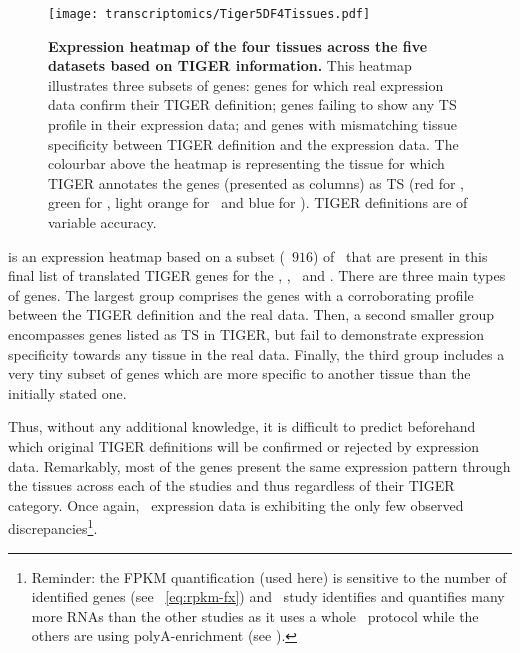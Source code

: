 \begin{figure}[!ht]
    \texttt{[image: transcriptomics/Tiger5DF4Tissues.pdf]}\centering
    \vspace{-.15in}
    \caption[Expression heatmap of the four tissues across the five datasets based on
    TiGER]{\label{fig:TigerGenes}\textbf{Expression heatmap of the four tissues
    across the five datasets based on \gls{TIGER} information.}
    This heatmap illustrates three subsets of genes:
    genes for which real expression data confirm their \gls{TIGER} definition;
    genes failing to show any \gls{TS} profile in their expression data; and
    genes with mismatching tissue specificity between \gls{TIGER}
    definition and the expression data.
    The colourbar above the heatmap is representing the tissue
    for which \gls{TIGER} annotates the genes (presented as columns) as \gls{TS}
    (red for \Heart, green for \kidney, light orange for \liver\ and blue for \testis).
    \gls{TIGER} definitions are of variable accuracy.
    }
\end{figure}

 is an expression heatmap based on
a subset (\ie\ $916$)  of \pcgs\
that are present in this final list of translated \gls{TIGER} genes
for the  \heart, \kidney, \liver\ and \testis.
There are three main types of genes.
The largest group comprises the genes with a corroborating profile
between the \gls{TIGER} definition and the real data.
Then, a second smaller group encompasses genes
listed as \gls{TS} in \gls{TIGER},
but fail to demonstrate expression specificity
towards any tissue in the real data.
Finally, the third group includes a very tiny subset of genes which
are more specific to another tissue than the initially stated one.\mybr\

Thus, without any additional knowledge,
it is difficult to predict beforehand which original \gls{TIGER} definitions
will be confirmed or rejected by expression data.
Remarkably, most of the genes present the same expression pattern
through the tissues across each of the studies
and thus regardless of their \gls{TIGER} category.
Once again, \castle\ expression data is exhibiting
the only few observed discrepancies\footnote{Reminder:
the \gls{FPKM} quantification (used here) is sensitive
to the number of identified genes (see ~\vref{eq:rpkm-fx})
and \castle\ study identifies and quantifies many more \glspl{RNA} than the
other studies as it uses a whole \RNA\ protocol
while the others are using polyA-enrichment (see ).}.\mybr\

